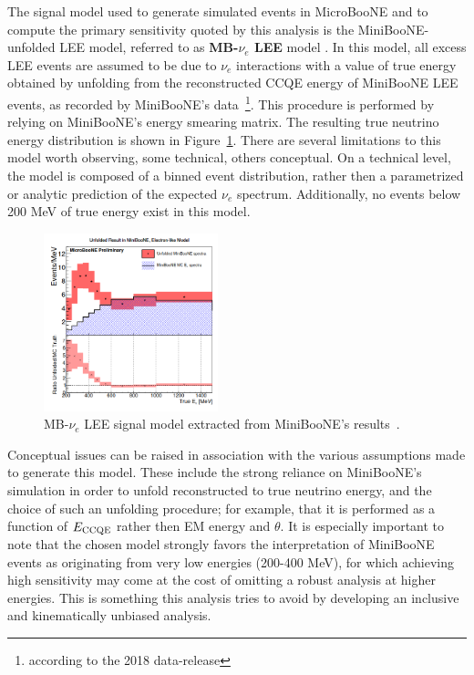 \par  The signal model used to generate simulated events in MicroBooNE and to compute the primary sensitivity quoted by this analysis  is the MiniBooNE-unfolded LEE model, referred to as \textbf{MB-$\nu_e$ LEE} model \cite{C2,C}. In this model, all excess LEE events are assumed to be due to $\nu_e$ interactions with a value of true energy obtained by unfolding from the reconstructed CCQE energy of MiniBooNE LEE events, as recorded by MiniBooNE's data~\footnote{according to the 2018 data-release}. This procedure is performed by relying on MiniBooNE's energy smearing matrix. The resulting true neutrino energy distribution is shown in Figure~\ref{fig:minibooneunfolded}. There are several limitations to this model worth observing, some technical, others conceptual. On a technical level, the model is composed of a binned event distribution, rather then a parametrized or analytic prediction of the expected $\nu_e$ spectrum. Additionally, no events below 200 MeV of true energy exist in this model. 
\begin{figure}[ht]
\begin{center}
\includegraphics[width=0.45\textwidth]{introduction/unfoldedminiboone.png}
\caption{\label{fig:minibooneunfolded}MB-$\nu_e$ LEE signal model extracted from MiniBooNE's results~\cite{C2}.}
\end{center}
\end{figure}
Conceptual issues can be raised in association with the various assumptions made to generate this model. These include the strong reliance on MiniBooNE's simulation in order to unfold reconstructed to true neutrino energy, and the choice of such an unfolding procedure; for example, that it is performed as a function of $E_{\rm CCQE}$ rather then EM energy and $\theta$.
It is especially important to note that the chosen model strongly favors the interpretation of MiniBooNE events as originating from very low energies (200-400 MeV), for which achieving high sensitivity may come at the cost of omitting a robust analysis at higher energies. This is something this analysis tries to avoid by developing an inclusive and kinematically unbiased analysis. %
